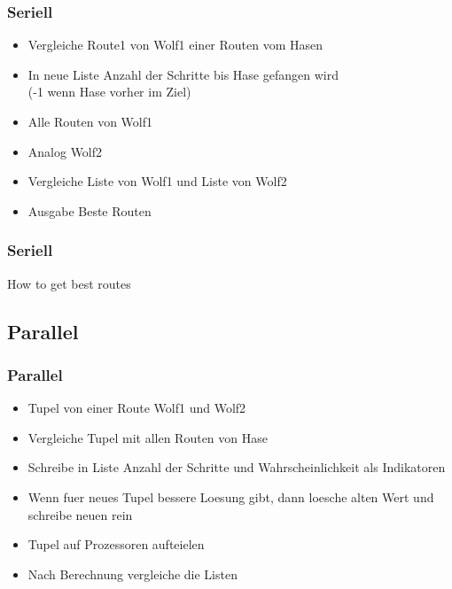 \documentclass{beamer}
\begin{document}
\begin{frame}
\frametitle{Seriell}
\begin{itemize}
\item Vergleiche Route1 von Wolf1 einer Routen vom Hasen
\item In neue Liste Anzahl der Schritte bis Hase gefangen wird \\(-1 wenn Hase vorher im Ziel)
\item Alle Routen von Wolf1 
\item Analog Wolf2
\item Vergleiche Liste von Wolf1 und Liste von Wolf2
\item Ausgabe Beste Routen
\end{itemize}
\end{frame}



\begin{frame}
\begin{algorithm}[H]
\frametitle{Seriell}
 {
 }
 \caption{How to get best routes}
\end{algorithm}
\end{frame}

\subsection{Parallel}
\begin{frame}
\frametitle{Parallel}
\begin{itemize}
\item Tupel von einer Route Wolf1 und Wolf2
\item Vergleiche Tupel mit allen Routen von Hase
\item Schreibe in Liste Anzahl der Schritte und Wahrscheinlichkeit als Indikatoren
\item Wenn fuer neues Tupel bessere Loesung gibt, dann loesche alten Wert und schreibe neuen rein

\item Tupel auf Prozessoren aufteielen
\item Nach Berechnung vergleiche die Listen
\end{itemize}
\end{frame}
\end{document}
